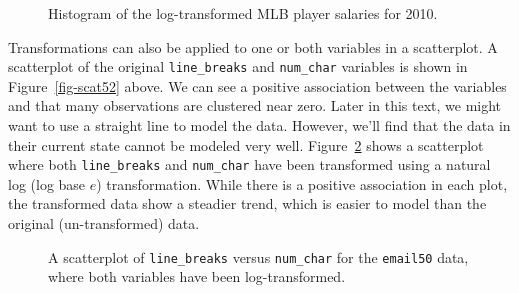 \documentclass[
  letterpaper,
  DIV=11,
  numbers=noendperiod]{scrreprt}
\begin{document}
\begin{figure}


\caption{\label{fig-hist512}Histogram of the log-transformed MLB player
salaries for 2010.}

\end{figure}%

Transformations can also be applied to one or both variables in a
scatterplot. A scatterplot of the original \texttt{line\_breaks} and
\texttt{num\_char} variables is shown in Figure~\ref{fig-scat52} above.
We can see a positive association between the variables and that many
observations are clustered near zero. Later in this text, we might want
to use a straight line to model the data. However, we'll find that the
data in their current state cannot be modeled very well.
Figure~\ref{fig-scat513} shows a scatterplot where both
\texttt{line\_breaks} and \texttt{num\_char} have been transformed using
a natural log (log base \(e\)) transformation. While there is a positive
association in each plot, the transformed data show a steadier trend,
which is easier to model than the original (un-transformed) data.

\begin{figure}


\caption{\label{fig-scat513}A scatterplot of \texttt{line\_breaks}
versus \texttt{num\_char} for the \texttt{email50} data, where both
variables have been log-transformed.}

\end{figure}%
\end{document}
